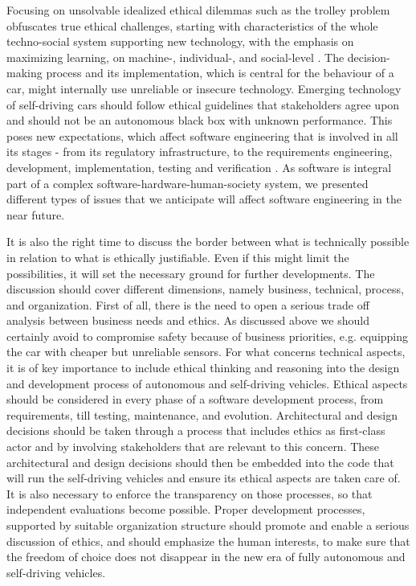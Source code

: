 Focusing on unsolvable idealized ethical dilemmas such as the trolley problem obfuscates true ethical challenges, starting with characteristics of the whole techno-social system supporting new technology, with the emphasis on maximizing learning, on machine-, individual-, and social-level \cite{DodigCrnkovic2012, DBLP:journals/corr/CharisiDFLMSSWY17}. The decision-making process and its implementation, which is central for the behaviour of a car, might internally use unreliable or insecure technology. Emerging technology of self-driving cars should follow ethical guidelines that stakeholders agree upon and should not be an autonomous black box with unknown performance. This poses new expectations, which affect software engineering that is involved in all its stages - from its regulatory infrastructure, to the requirements engineering, development, implementation, testing and verification \cite{Greene2016_1514,MoralMachine2016,Mooney2016,Ackerman2016,DBLP:journals/corr/CharisiDFLMSSWY17}. As software is integral part of a complex software-hardware-human-society system, we presented different types of issues that we anticipate will affect software engineering in the near future.

It is also the right time to discuss the border between what is technically possible in relation to what is ethically justifiable. Even if this might limit the possibilities, it will set the necessary ground for further developments. 
The discussion should cover different dimensions, namely business, technical, process, and organization. First of all, there is the need to open a serious trade off analysis between business needs and ethics. As discussed above we should certainly avoid to compromise safety because of business priorities, e.g. equipping the car with cheaper but unreliable sensors. 
For what concerns technical aspects, it is of key importance to include ethical thinking and reasoning into the design and development process of autonomous and self-driving vehicles. Ethical aspects should be considered in every phase of a software development process, from requirements, till testing, maintenance, and evolution. Architectural and design decisions should be taken through a process that includes ethics as first-class actor and by involving stakeholders that are relevant to this concern. These architectural and design decisions should then be embedded into the code that will run the self-driving vehicles and ensure its ethical aspects are taken care of.    
It is also necessary to enforce the transparency on those processes, so that independent evaluations become possible. Proper development processes, supported by suitable organization structure should promote and enable a serious discussion of ethics, and 
should emphasize the human interests, to make sure that the freedom of choice does not disappear in the new era of fully autonomous and self-driving vehicles. 

  
 



			
			
			



